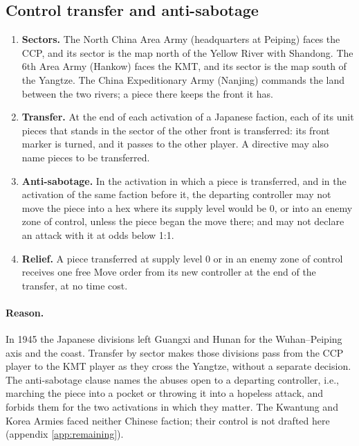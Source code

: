\documentclass[11pt]{article}
\begin{document}
\subsection{Control transfer and anti-sabotage}\label{app:transfer}
\draft
\begin{enumerate}
\item \textbf{Sectors.} The North China Area Army (headquarters at Peiping) faces the CCP, and its sector is the map north of the Yellow River with Shandong. The 6th Area Army (Hankow) faces the KMT, and its sector is the map south of the Yangtze. The China Expeditionary Army (Nanjing) commands the land between the two rivers; a piece there keeps the front it has.
\item \textbf{Transfer.} At the end of each activation of a Japanese faction, each of its unit pieces that stands in the sector of the other front is transferred: its front marker is turned, and it passes to the other player. A directive may also name pieces to be transferred.
\item \textbf{Anti-sabotage.} In the activation in which a piece is transferred, and in the activation of the same faction before it, the departing controller may not move the piece into a hex where its supply level would be 0, or into an enemy zone of control, unless the piece began the move there; and may not declare an attack with it at odds below 1:1.
\item \textbf{Relief.} A piece transferred at supply level 0 or in an enemy zone of control receives one free Move order from its new controller at the end of the transfer, at no time cost.
\end{enumerate}
\paragraph{Reason.} In 1945 the Japanese divisions left Guangxi and Hunan for the Wuhan--Peiping axis and the coast. Transfer by sector makes those divisions pass from the CCP player to the KMT player as they cross the Yangtze, without a separate decision. The anti-sabotage clause names the abuses open to a departing controller, i.e., marching the piece into a pocket or throwing it into a hopeless attack, and forbids them for the two activations in which they matter. The Kwantung and Korea Armies faced neither Chinese faction; their control is not drafted here (appendix \ref{app:remaining}).
\end{document}
